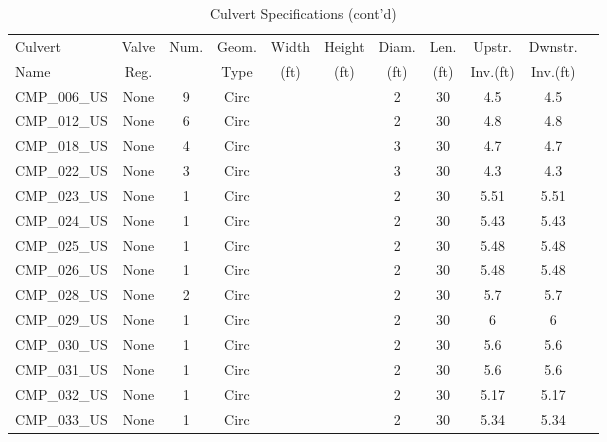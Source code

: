 \begin{table}[]
\caption{Culvert Specifications (cont'd)}
\label{tab:culv-specs2}
\begin{tabular}{@{}lcccccccccc@{}}
\toprule
Culvert       & Valve      & Num.     & Geom.& Width  & Height & Diam.    & Len.   & Upstr.    & Dwnstr.    \\
Name          & Reg.       &          & Type & (ft)   & (ft)   & (ft)     & (ft)   & Inv.(ft)  & Inv.(ft)   \\
\midrule
CMP\_006\_US  & None       & 9        & Circ &        &       & 2        & 30     & 4.5       & 4.5        \\
CMP\_012\_US  & None       & 6        & Circ &        &       & 2        & 30     & 4.8       & 4.8        \\
CMP\_018\_US  & None       & 4        & Circ &        &       & 3        & 30     & 4.7       & 4.7        \\
CMP\_022\_US  & None       & 3        & Circ &        &       & 3        & 30     & 4.3       & 4.3        \\
CMP\_023\_US  & None       & 1        & Circ &        &       & 2        & 30     & 5.51      & 5.51       \\
CMP\_024\_US  & None       & 1        & Circ &        &       & 2        & 30     & 5.43      & 5.43       \\
CMP\_025\_US  & None       & 1        & Circ &        &       & 2        & 30     & 5.48      & 5.48       \\
CMP\_026\_US  & None       & 1        & Circ &        &       & 2        & 30     & 5.48      & 5.48       \\
CMP\_028\_US  & None       & 2        & Circ &        &       & 2        & 30     & 5.7       & 5.7        \\
CMP\_029\_US  & None       & 1        & Circ &        &       & 2        & 30     & 6         & 6          \\
CMP\_030\_US  & None       & 1        & Circ &        &       & 2        & 30     & 5.6       & 5.6        \\
CMP\_031\_US  & None       & 1        & Circ &        &       & 2        & 30     & 5.6       & 5.6        \\
CMP\_032\_US  & None       & 1        & Circ &        &       & 2        & 30     & 5.17      & 5.17       \\
CMP\_033\_US  & None       & 1        & Circ &        &       & 2        & 30     & 5.34      & 5.34       \\

\end{tabular}
\end{table}
